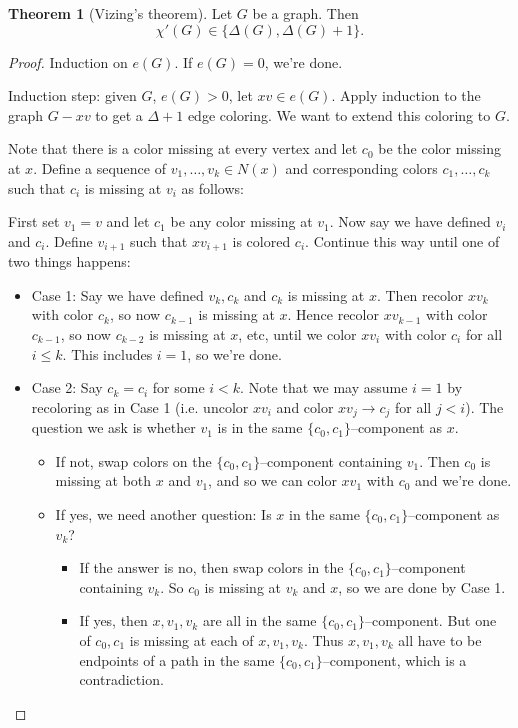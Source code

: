 \documentclass{article}
\theoremstyle{definition}
\newtheorem{theorem}{Theorem}[section]
\begin{document}
\begin{theorem}[Vizing's theorem]
    Let $G$ be a graph. Then $$\chi'(G) \in \{\Delta(G), \Delta(G)+1\}.$$
\end{theorem}
\begin{proof}
    Induction on $e(G)$. If $e(G)=0$, we're done.

    Induction step: given $G$, $e(G)>0$, let $xv \in e(G)$. Apply induction to the graph $G-xv$ to get a $\Delta+1$ edge coloring. We want to extend this coloring to $G$.

    Note that there is a color missing at every vertex and let $c_0$ be the color missing at $x$. Define a sequence of $v_1,\ldots,v_k \in N(x)$ and corresponding colors $c_1,\ldots,c_k$ such that $c_i$ is missing at $v_i$ as follows:

    First set $v_1=v$ and let $c_1$ be any color missing at $v_1$. Now say we have defined $v_i$ and $c_i$. Define $v_{i+1}$ such that $xv_{i+1}$ is colored $c_i$. Continue this way until one of two things happens:
    \begin{itemize}
        \item Case 1: Say we have defined $v_k,c_k$ and $c_k$ is missing at $x.$ Then recolor $xv_k$ with color $c_k$, so now $c_{k-1}$ is missing at $x$. Hence recolor $xv_{k-1}$ with color $c_{k-1}$, so now $c_{k-2}$ is missing at $x$, etc, until we color $xv_i$ with color $c_i$ for all $i\le k$. This includes $i=1$, so we're done.
        \item Case 2: Say $c_k=c_i$ for some $i<k$. Note that we may assume $i=1$ by recoloring as in Case 1 (i.e. uncolor $xv_{i}$ and color $xv_j \to c_j$ for all $j<i$). The question we ask is whether $v_1$ is in the same $\{c_0,c_1\}$--component as $x$.
        \begin{itemize}
            \item If not, swap colors on the $\{c_0,c_1\}$--component containing $v_1$. Then $c_0$ is missing at both $x$ and $v_1$, and so we can color $xv_1$ with $c_0$ and we're done.
            \item If yes, we need another question: Is $x$ in the same $\{c_0,c_1\}$--component as $v_k$?
            \begin{itemize}
                \item If the answer is no, then swap colors in the $\{c_0,c_1\}$--component containing $v_k$. So $c_0$ is missing at $v_k$ and $x$, so we are done by Case 1.
                \item If yes, then $x,v_1,v_k$ are all in the same $\{c_0,c_1\}$--component. But one of $c_0,c_1$ is missing at each of $x,v_1,v_k$. Thus $x,v_1,v_k$ all have to be endpoints of a path in the same $\{c_0,c_1\}$--component, which is a contradiction.
            \end{itemize}
        \end{itemize}
    \end{itemize}
\end{proof}
\end{document}

